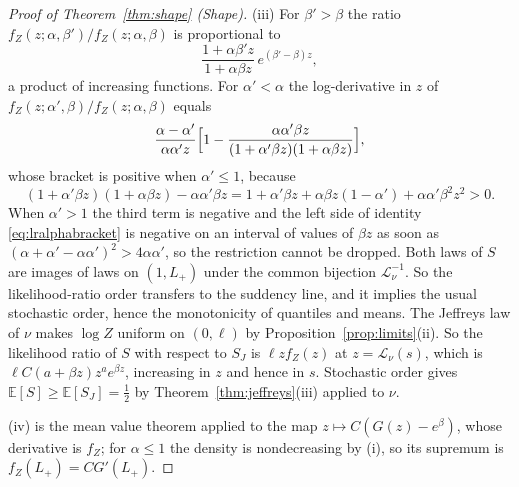 \documentclass[10pt,a4paper]{amsart}
\providecommand{\E}{\mathbb{E}}
\providecommand{\Leh}{\mathscr{L}}
\begin{document}
\begin{proof}[Proof of Theorem~\ref{thm:shape} (Shape)]
			\noindent(iii) For
			$\beta'>\beta$ the ratio $f_Z(z;\alpha,\beta')/f_Z(z;\alpha,\beta)$
			is proportional to
			\begin{equation}\label{eq:lrbeta}
				\frac{1+\alpha\beta'z}{1+\alpha\beta z}\,e^{(\beta'-\beta)z},
			\end{equation}
			a product of increasing functions. For $\alpha'<\alpha$ the log-derivative in $z$ of $f_Z(z;\alpha',\beta)/f_Z(z;\alpha,\beta)$
			equals
			\begin{equation}\label{eq:lralpha}
				\frac{\alpha-\alpha'}{\alpha\alpha'z}\Bigl[1-\frac{\alpha\alpha'\beta z}{(1+\alpha'\beta z)(1+\alpha\beta z)}\Bigr],
			\end{equation}
			whose bracket is positive when $\alpha'\le1$, because
			\begin{equation}\label{eq:lralphabracket}
				(1+\alpha'\beta z)(1+\alpha\beta z)-\alpha\alpha'\beta z
				=1+\alpha'\beta z+\alpha\beta z(1-\alpha')+\alpha\alpha'\beta^{2}z^{2}>0 .
			\end{equation}
			When $\alpha'>1$ the third term is negative and the left side of
			identity \eqref{eq:lralphabracket} is negative on an interval of
			values of $\beta z$ as soon as
			$(\alpha+\alpha'-\alpha\alpha')^{2}>4\alpha\alpha'$, so the
			restriction cannot be dropped. Both laws
			of $S$ are images of laws on $(1,L_+)$ under the common bijection
			$\Leh_\nu^{-1}$. So the likelihood-ratio order transfers to the
			suddency line, and it implies the usual stochastic order, hence
			the monotonicity of quantiles and means. The Jeffreys law of $\nu$
			makes $\log Z$ uniform on $(0,\ell)$ by
			Proposition~\ref{prop:limits}(ii). So the likelihood ratio of $S$
			with respect to $S_J$ is $\ell zf_Z(z)$ at $z=\Leh_\nu(s)$, which
			is $\ell C(a+\beta z)z^{a}e^{\beta z}$, increasing in $z$ and hence
			in $s$. Stochastic order gives $\E[S]\ge\E[S_J]=\tfrac12$ by
			Theorem~\ref{thm:jeffreys}(iii) applied to $\nu$.
			
			\noindent(iv) is the mean value theorem applied to the map
			$z\mapsto C(G(z)-e^{\beta})$, whose derivative is $f_Z$; for
			$\alpha\le1$ the density is nondecreasing by (i), so its supremum is
			$f_Z(L_+)=CG'(L_+)$.
		\end{proof}
\end{document}
